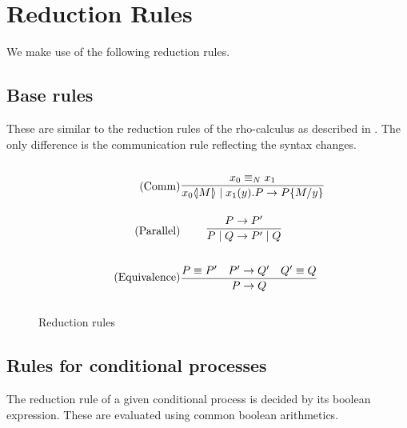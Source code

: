 \FloatBarrier

\section{Reduction Rules}
We make use of the following reduction rules.

\subsection{Base rules}
These are similar to the reduction rules of the rho-calculus as described in \citep{Meredith2005}. The only difference is the communication rule reflecting the syntax changes.

\begin{figure}[h]
	\begin{align}
	\tag{Comm} \infrule{x_0 \equiv_N x_1}{\lift{x_0}{M}\para\inp{x_1}{y}P\ra P\{M/y\}}&\\
	\tag{Parallel} \infrule{P\ra P'}{P\para Q\ra P'\para Q}&\\
	\tag{Equivalence} \infrule{P\equiv P'\quad P'\ra Q'\quad Q'\equiv Q}{P\ra Q}&
	\end{align}
	\caption{Reduction rules}
	\label{redrule}
\end{figure}

%
%
%


\FloatBarrier

\subsection{Rules for conditional processes}
The reduction rule of a given conditional process is decided by its boolean expression. These are evaluated using common boolean arithmetics.

